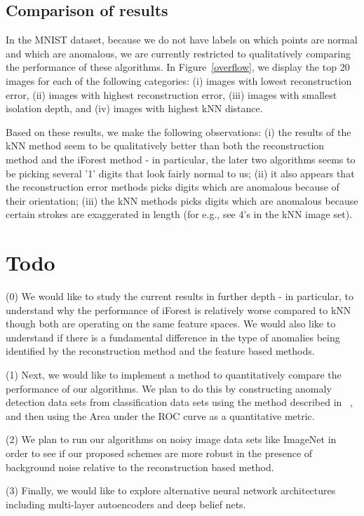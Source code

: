\documentclass[10pt,twocolumn,letterpaper]{article}
\begin{document}
\subsection{Comparison of results}
In the MNIST dataset, because we do not have labels on which points are normal and which are anomalous, we are currently restricted to qualitatively comparing the performance of these algorithms. In Figure~\ref{overflow}, we display the top 20 images for each of the following categories: (i) images with lowest reconstruction error, (ii) images with highest reconstruction error, (iii) images with smallest isolation depth, and (iv) images with highest kNN distance. 

Based on these results, we make the following observations: (i) the results of the kNN method seem to be qualitatively better than both the reconstruction method and the iForest method - in particular, the later two algorithms seems to be picking several '1' digits that look fairly normal to us; (ii) it also appears that the reconstruction error methods picks digits which are anomalous because of their orientation; (iii) the kNN methods picks digits which are anomalous because certain strokes are exaggerated in length (for e.g., see 4's in the kNN image set).   

\section{Todo}
(0) We would like to study the current results in further depth - in particular, to understand why the performance of iForest is relatively worse compared to kNN though both are operating on the same feature spaces. We would also like to understand if there is a fundamental difference in the type of anomalies being identified by the reconstruction method and the feature based methods.

(1) Next, we would like to implement a method to quantitatively compare the performance of our algorithms. We plan to do this by constructing anomaly detection data sets from classification data sets using the method described in ~\cite{benchmark}, and then using the Area under the ROC curve as a quantitative metric.

(2) We plan to run our algorithms on noisy image data sets like ImageNet in order to see if our proposed schemes are more robust in the presence of background noise relative to the reconstruction based method.  

(3) Finally, we would like to explore alternative neural network architectures including multi-layer autoencoders and deep belief nets.
\end{document}
